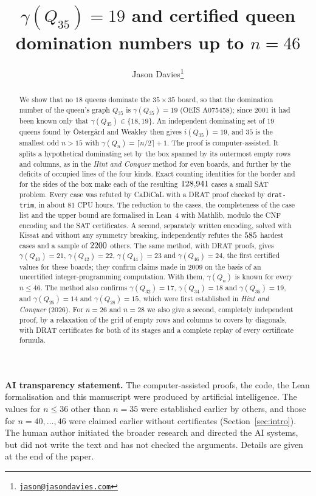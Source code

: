 \documentclass[11pt]{article}
\title{$\gamma(Q_{35})=19$ and certified queen domination numbers up to $n=46$}
\author{Jason Davies\thanks{\href{mailto:jason@jasondavies.com}{\nolinkurl{jason@jasondavies.com}}}}
\date{\clDate}
\theoremstyle{definition}
\theoremstyle{remark}
\begin{document}
\maketitle
\begin{abstract}
We show that no $18$ queens dominate the $35\times35$ board, so that the domination number of the queen's
graph $Q_{35}$ is $\gamma(Q_{35})=19$ (OEIS A075458); since 2001 it had been known only that
$\gamma(Q_{35})\in\{18,19\}$. An independent dominating set of $19$ queens found by \"Osterg\aa rd and
Weakley then gives $i(Q_{35})=19$, and $35$ is the smallest odd $n>15$ with
$\gamma(Q_n)=\lceil n/2\rceil+1$. The proof is computer-assisted. It splits a hypothetical dominating set
by the box spanned by its outermost empty rows and columns, as in the \emph{Hint and Conquer} method
for even boards, and further by the deficits of occupied lines of the four kinds. Exact counting
identities for the border and for the sides of the box make each of the resulting $128{,}941$ cases a
small SAT problem. Every case was refuted by CaDiCaL with a DRAT proof checked by \texttt{drat-trim}, in
about $81$ CPU hours. The reduction to the cases, the completeness of the case list and the upper bound
are formalised in Lean~4 with Mathlib, modulo the CNF encoding and the SAT certificates. A second,
separately written encoding, solved with Kissat and without any symmetry breaking, independently refutes
the $585$ hardest cases and a sample of $2200$ others. The same method, with DRAT
proofs, gives $\gamma(Q_{40})=21$, $\gamma(Q_{42})=22$, $\gamma(Q_{44})=23$ and $\gamma(Q_{46})=24$, the
first certified values for these boards; they confirm claims made in 2009 on the basis of an uncertified
integer-programming computation. With them, $\gamma(Q_n)$ is known for every $n\le46$. The method also
confirms $\gamma(Q_{32})=17$, $\gamma(Q_{34})=18$ and $\gamma(Q_{36})=19$, and $\gamma(Q_{26})=14$ and
$\gamma(Q_{28})=15$, which were first established in \emph{Hint and Conquer} (2026). For $n=26$ and $n=28$ we also give a second, completely independent proof, by a relaxation of
the grid of empty rows and columns to covers by diagonals, with DRAT certificates for both of its stages
and a complete replay of every certificate formula.
\end{abstract}

\noindent\textbf{AI transparency statement.} The computer-assisted proofs, the code, the Lean
formalisation and this manuscript were produced by artificial intelligence. The values for $n\le36$ other
than $n=35$ were established earlier by others, and those for $n=40,\dots,46$ were claimed earlier without
certificates (Section~\ref{sec:intro}). The human author initiated the broader
research and directed the AI systems, but did not write the text and has not checked the arguments.
Details are given at the end of the paper.
\end{document}
